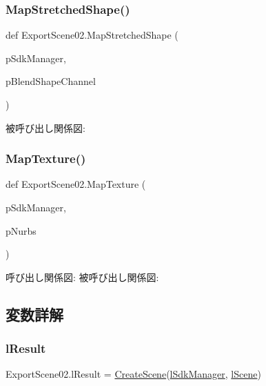 \subsubsection{\texorpdfstring{Map\+Stretched\+Shape()}{MapStretchedShape()}}
{\footnotesize\ttfamily def Export\+Scene02.\+Map\+Stretched\+Shape (\begin{DoxyParamCaption}\item[{}]{p\+Sdk\+Manager,  }\item[{}]{p\+Blend\+Shape\+Channel }\end{DoxyParamCaption})}

被呼び出し関係図\+:
\mbox{\label{namespace_export_scene02_abda1e709837c1815c794e3fae84ac3d9}} 
\subsubsection{\texorpdfstring{Map\+Texture()}{MapTexture()}}
{\footnotesize\ttfamily def Export\+Scene02.\+Map\+Texture (\begin{DoxyParamCaption}\item[{}]{p\+Sdk\+Manager,  }\item[{}]{p\+Nurbs }\end{DoxyParamCaption})}

呼び出し関係図\+:
被呼び出し関係図\+:


\subsection{変数詳解}
\mbox{\label{namespace_export_scene02_ae01fe90d372cb2ce82553950685edcea}} 
\subsubsection{\texorpdfstring{l\+Result}{lResult}}
{\footnotesize\ttfamily Export\+Scene02.\+l\+Result = \hyperlink{namespace_export_scene02_ab05e0f19c09bbd1997ef575f237d317e}{Create\+Scene}(\hyperlink{namespace_export_scene02_ae94b7d754208f6a389c4641865d95b00}{l\+Sdk\+Manager}, \hyperlink{namespace_export_scene02_aa5d8616f7025fcaf75014eeb9d265149}{l\+Scene})}

